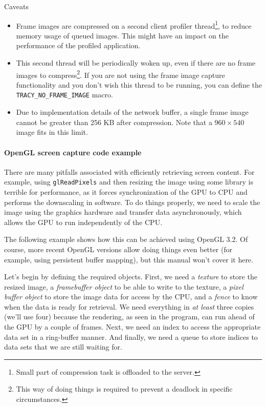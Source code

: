 \documentclass[hidelinks,titlepage,a4paper]{article}
\begin{document}
\begin{bclogo}[
noborder=true,
couleur=black!5,
logo=\bcattention
]{Caveats}
\begin{itemize}
\item Frame images are compressed on a second client profiler thread\footnote{Small part of compression task is offloaded to the server.}, to reduce memory usage of queued images. This might have an impact on the performance of the profiled application.
\item This second thread will be periodically woken up, even if there are no frame images to compress\footnote{This way of doing things is required to prevent a deadlock in specific circumstances.}. If you are not using the frame image capture functionality and you don't wish this thread to be running, you can define the \texttt{TRACY\_NO\_FRAME\_IMAGE} macro.
\item Due to implementation details of the network buffer, a single frame image cannot be greater than 256 KB after compression. Note that a $960\times540$ image fits in this limit.
\end{itemize}
\end{bclogo}

\paragraph{OpenGL screen capture code example}
\label{screenshotcode}

There are many pitfalls associated with efficiently retrieving screen content. For example, using \texttt{glReadPixels} and then resizing the image using some library is terrible for performance, as it forces synchronization of the GPU to CPU and performs the downscaling in software. To do things properly, we need to scale the image using the graphics hardware and transfer data asynchronously, which allows the GPU to run independently of the CPU.

The following example shows how this can be achieved using OpenGL 3.2. Of course, more recent OpenGL versions allow doing things even better (for example, using persistent buffer mapping), but this manual won't cover it here.

Let's begin by defining the required objects. First, we need a \emph{texture} to store the resized image, a \emph{framebuffer object} to be able to write to the texture, a \emph{pixel buffer object} to store the image data for access by the CPU, and a \emph{fence} to know when the data is ready for retrieval. We need everything in \emph{at least} three copies (we'll use four) because the rendering, as seen in the program, can run ahead of the GPU by a couple of frames. Next, we need an index to access the appropriate data set in a ring-buffer manner. And finally, we need a queue to store indices to data sets that we are still waiting for.
\end{document}
